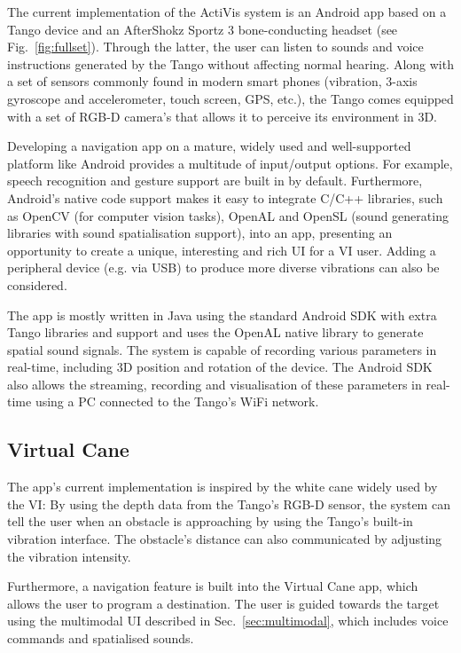 \documentclass[letterpaper]{article}
\begin{document}
The current implementation of the ActiVis system is an Android app based on a Tango device and an AfterShokz Sportz 3 bone-conducting headset (see Fig.~\ref{fig:fullset}). Through the latter, the user can listen to sounds and voice instructions generated by the Tango without affecting normal hearing. Along with a set of sensors commonly found in modern smart phones (vibration, 3-axis gyroscope and accelerometer, touch screen, GPS, etc.), the Tango comes equipped with a set of RGB-D camera's that allows it to perceive its environment in 3D.

Developing a navigation app on a mature, widely used and well-supported platform like Android provides a multitude of input/output options. For example, speech recognition and gesture support are built in by default. Furthermore, Android's native code support makes it easy to integrate C/C++ libraries, such as OpenCV (for computer vision tasks), OpenAL and OpenSL (sound generating libraries with sound spatialisation support), into an app, presenting an opportunity to create a unique, interesting and rich UI for a VI user. Adding a peripheral device (e.g. via USB) to produce more diverse vibrations can also be considered.

The app is mostly written in Java using the standard Android SDK with extra Tango libraries and support and uses the OpenAL native library to generate spatial sound signals. The system is capable of recording various parameters in real-time, including 3D position and rotation of the device. The Android SDK also allows the streaming, recording and visualisation of these parameters in real-time using a PC connected to the Tango's WiFi network.

\subsection{Virtual Cane}

The app's current implementation is inspired by the white cane widely used by the VI: By using the depth data from the Tango's RGB-D sensor, the system can tell the user when an obstacle is approaching by using the Tango's built-in vibration interface. The obstacle's distance can also communicated by adjusting the vibration intensity.  

Furthermore, a navigation feature is built into the Virtual Cane app, which allows the user to program a destination. The user is guided towards the target using the multimodal UI described in Sec.~\ref{sec:multimodal}, which includes voice commands and spatialised sounds.
\end{document}
